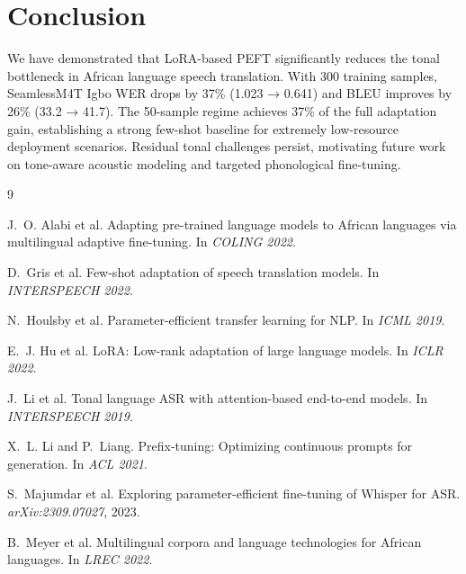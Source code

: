 \documentclass[11pt,a4paper]{article}
\begin{document}
\section{Conclusion}
\label{sec:conclusion}

We have demonstrated that LoRA-based PEFT significantly reduces the tonal bottleneck in African language speech translation. With 300 training samples, SeamlessM4T Igbo WER drops by 37\% (1.023 → 0.641) and BLEU improves by 26\% (33.2 → 41.7). The 50-sample regime achieves 37\% of the full adaptation gain, establishing a strong few-shot baseline for extremely low-resource deployment scenarios. Residual tonal challenges persist, motivating future work on tone-aware acoustic modeling and targeted phonological fine-tuning.




\begin{thebibliography}{9}

J.~O. Alabi et al.
\newblock Adapting pre-trained language models to {A}frican languages via multilingual adaptive fine-tuning.
\newblock In \emph{COLING 2022}.

D.~Gris et al.
\newblock Few-shot adaptation of speech translation models.
\newblock In \emph{INTERSPEECH 2022}.

N.~Houlsby et al.
\newblock Parameter-efficient transfer learning for {NLP}.
\newblock In \emph{ICML 2019}.

E.~J. Hu et al.
\newblock Lo{RA}: Low-rank adaptation of large language models.
\newblock In \emph{ICLR 2022}.

J.~Li et al.
\newblock Tonal language ASR with attention-based end-to-end models.
\newblock In \emph{INTERSPEECH 2019}.

X.~L. Li and P.~Liang.
\newblock Prefix-tuning: Optimizing continuous prompts for generation.
\newblock In \emph{ACL 2021}.

S.~Majumdar et al.
\newblock Exploring parameter-efficient fine-tuning of {Whisper} for {ASR}.
\newblock \emph{arXiv:2309.07027}, 2023.

B.~Meyer et al.
\newblock Multilingual corpora and language technologies for {A}frican languages.
\newblock In \emph{LREC 2022}.

\end{thebibliography}
\end{document}

